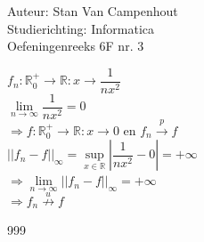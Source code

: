 \documentclass[a4paper]{article}
\begin{document}
  
\noindent \large Auteur: Stan Van Campenhout \\
\noindent \large Studierichting:  Informatica\\
\noindent \large Oefeningenreeks 6F nr. 3\\

\medskip

\normalsize

$ f_n : \mathbb{R}_0^+ \rightarrow \mathbb{R}  : x \rightarrow \dfrac{1}{nx^2} $\\

$ \lim\limits_{n \rightarrow \infty}\dfrac{1}{nx^2} = 0 $\\

$ \Rightarrow f : \mathbb{R}_0^+ \rightarrow \mathbb{R} : x \rightarrow 0 $ en $  f_n \stackrel{p}{\rightarrow} f $\\

$ \left|\left|f_n - f \right|\right|_{\infty} = \sup\limits_{x \in \mathbb{R}}\left|\dfrac{1}{nx^2} - 0 \right| = +\infty $\\

$ \Rightarrow \lim\limits_{n \rightarrow \infty}\left|\left|f_n - f \right|\right|_{\infty} = +\infty $\\

$ \Rightarrow f_n \stackrel{u}{\not\rightarrow} f $\\

\begin{thebibliography}{999}
\end{thebibliography}
\end{document}
